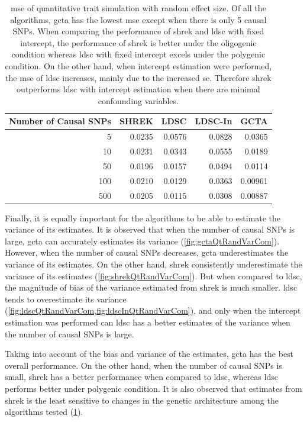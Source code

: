 	\begin{table}
		\centering
		\begin{tabular}{rrrrr}
			\toprule
			Number of Causal SNPs&	SHREK&	LDSC&	LDSC-In&	GCTA \\
			\midrule
			5	&	0.0235	&	0.0576	&	0.0828	&	0.0365\\
			10	&	0.0231	&	0.0343	&	0.0555	&	0.0189\\
			50	&	0.0196	&	0.0157	&	0.0494	&	0.0114\\
			100	&	0.0210	&	0.0129	&	0.0363	&	0.00961\\
			500	&	0.0205	&	0.0115	&	0.0308	&	0.00887\\
			\bottomrule
		\end{tabular}
		\caption[MSE of Quantitative Trait Simulation with Random Effect Size]{
			\Gls{mse} of quantitative trait simulation with random effect size.
			Of all the algorithms, \gls{gcta} has the lowest \gls{mse} except when there is only 5 causal \glspl{SNP}.
			When comparing the performance of \gls{shrek} and \gls{ldsc} with fixed intercept, the performance of \gls{shrek} is better under the oligogenic condition whereas \gls{ldsc} with fixed intercept excels under the polygenic condition. 
			On the other hand, when intercept estimation were performed, the \gls{mse} of \gls{ldsc} increases, mainly due to the increased \gls{se}. 
			Therefore \gls{shrek} outperforms \gls{ldsc} with intercept estimation when there are minimal confounding variables.
		}
		\label{tab:mseQtRandom}
	\end{table}
		Finally, it is equally important for the algorithms to be able to estimate the variance of its estimates.
		It is observed that when the number of causal \glspl{SNP} is large, \gls{gcta} can accurately estimates its variance (\cref{fig:gctaQtRandVarCom}).
		However, when the number of causal \glspl{SNP} decreases, \gls{gcta} underestimates the variance of its estimates. 
		On the other hand, \gls{shrek} consistently underestimate the variance of its estimates (\cref{fig:shrekQtRandVarCom}).
		But when compared to \gls{ldsc}, the magnitude of bias of the variance estimated from \gls{shrek} is much smaller.
		\gls{ldsc} tends to overestimate its variance (\cref{fig:ldscQtRandVarCom,fig:ldscInQtRandVarCom}), and only when the intercept estimation was performed can \gls{ldsc} has a better estimates of the variance when the number of causal \glspl{SNP} is large. 
		
		Taking into account of the bias and variance of the estimates, \gls{gcta} has the best overall performance.
		On the other hand, when the number of causal \glspl{SNP} is small, \gls{shrek} has a better performance when compared to \gls{ldsc}, whereas \gls{ldsc} performs better under polygenic condition.
		It is also observed that estimates from \gls{shrek} is the least sensitive to changes in the genetic architecture among the algorithms tested (\cref{tab:mseQtRandom}).  
		
